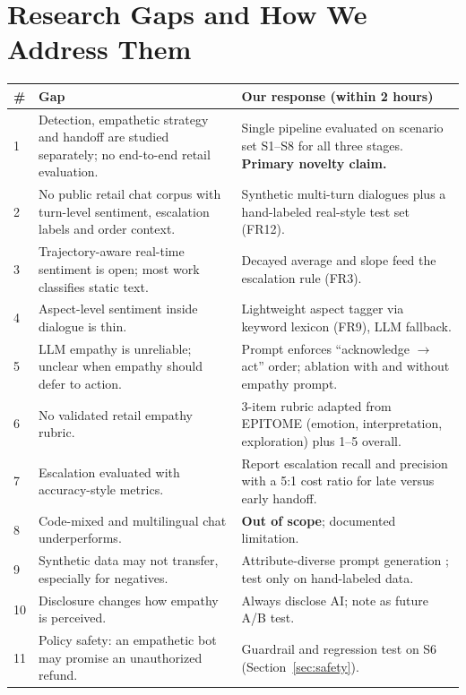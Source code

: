 \documentclass[11pt,a4paper]{article}
\begin{document}
\section{Research Gaps and How We Address Them}
\begin{longtable}{@{}p{0.6cm}p{5.6cm}p{7.6cm}@{}}
\toprule
\textbf{\#} & \textbf{Gap} & \textbf{Our response (within 2 hours)}\\
\midrule
\endhead
1 & Detection, empathetic strategy and handoff are studied separately; no end-to-end retail evaluation. & Single pipeline evaluated on scenario set S1--S8 for all three stages. \textbf{Primary novelty claim.}\\
2 & No public retail chat corpus with turn-level sentiment, escalation labels and order context. & Synthetic multi-turn dialogues plus a hand-labeled real-style test set (FR12).\\
3 & Trajectory-aware real-time sentiment is open; most work classifies static text. & Decayed average and slope feed the escalation rule (FR3).\\
4 & Aspect-level sentiment inside dialogue is thin. & Lightweight aspect tagger via keyword lexicon (FR9), LLM fallback.\\
5 & LLM empathy is unreliable; unclear when empathy should defer to action. & Prompt enforces ``acknowledge $\rightarrow$ act'' order; ablation with and without empathy prompt.\\
6 & No validated retail empathy rubric. & 3-item rubric adapted from EPITOME (emotion, interpretation, exploration) plus 1--5 overall.\\
7 & Escalation evaluated with accuracy-style metrics. & Report escalation recall and precision with a 5:1 cost ratio for late versus early handoff.\\
8 & Code-mixed and multilingual chat underperforms. & \textbf{Out of scope}; documented limitation.\\
9 & Synthetic data may not transfer, especially for negatives. & Attribute-diverse prompt generation \cite{yu2023}; test only on hand-labeled data.\\
10 & Disclosure changes how empathy is perceived. & Always disclose AI; note as future A/B test.\\
11 & Policy safety: an empathetic bot may promise an unauthorized refund. & Guardrail and regression test on S6 (Section~\ref{sec:safety}).\\
\bottomrule
\end{longtable}
\end{document}
